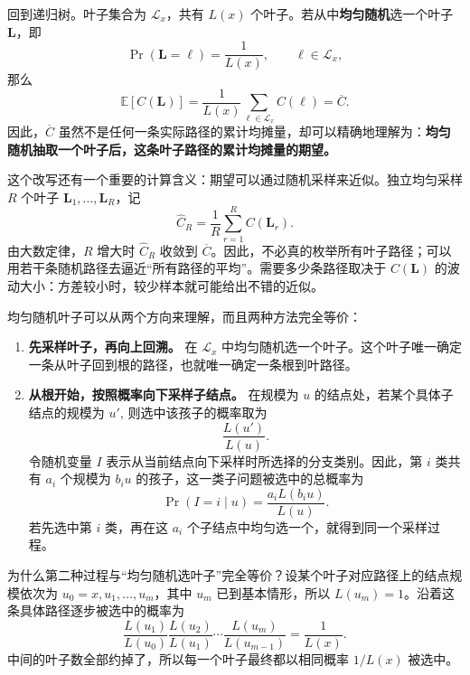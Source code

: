 \documentclass[11pt,a4paper]{article}
\begin{document}
回到递归树。叶子集合为 $\mathcal L_x$，共有 $L(x)$ 个叶子。若从中\textbf{均匀随机}选一个叶子 $\mathbf L$，即
\begin{equation}
\Pr(\mathbf L=\ell)=\frac{1}{L(x)},
\qquad \ell\in\mathcal L_x,
\label{eq:uniform-random-leaf}
\end{equation}
那么
\begin{equation}
\mathbb E[C(\mathbf L)]
=\frac{1}{L(x)}\sum_{\ell\in\mathcal L_x}C(\ell)
=\overline C.
\label{eq:random-leaf-expectation}
\end{equation}
因此，$\overline C$ 虽然不是任何一条实际路径的累计均摊量，却可以精确地理解为：\textbf{均匀随机抽取一个叶子后，这条叶子路径的累计均摊量的期望。}

这个改写还有一个重要的计算含义：期望可以通过随机采样来近似。独立均匀采样 $R$ 个叶子 $\mathbf L_1,\ldots,\mathbf L_R$，记
\begin{equation}
\widehat C_R
=\frac{1}{R}\sum_{r=1}^{R}C(\mathbf L_r).
\label{eq:monte-carlo-leaf-average}
\end{equation}
由大数定律，$R$ 增大时 $\widehat C_R$ 收敛到 $\overline C$。因此，不必真的枚举所有叶子路径；可以用若干条随机路径去逼近“所有路径的平均”。需要多少条路径取决于 $C(\mathbf L)$ 的波动大小：方差较小时，较少样本就可能给出不错的近似。

均匀随机叶子可以从两个方向来理解，而且两种方法完全等价：
\begin{enumerate}[label=(\arabic*)]
\item \textbf{先采样叶子，再向上回溯。} 在 $\mathcal L_x$ 中均匀随机选一个叶子。这个叶子唯一确定一条从叶子回到根的路径，也就唯一确定一条根到叶路径。
\item \textbf{从根开始，按照概率向下采样子结点。} 在规模为 $u$ 的结点处，若某个具体子结点的规模为 $u'$, 则选中该孩子的概率取为
\[
\frac{L(u')}{L(u)}.
\]
令随机变量 $I$ 表示从当前结点向下采样时所选择的分支类别。因此，第 $i$ 类共有 $a_i$ 个规模为 $b_i u$ 的孩子，这一类子问题被选中的总概率为
\begin{equation}
\Pr(I=i\mid u)
=\frac{a_iL(b_i u)}{L(u)}.
\label{eq:random-child-probability-exact}
\end{equation}
若先选中第 $i$ 类，再在这 $a_i$ 个子结点中均匀选一个，就得到同一个采样过程。
\end{enumerate}

为什么第二种过程与“均匀随机选叶子”完全等价？设某个叶子对应路径上的结点规模依次为 $u_0=x,u_1,\ldots,u_m$，其中 $u_m$ 已到基本情形，所以 $L(u_m)=1$。沿着这条具体路径逐步被选中的概率为
\begin{equation}
\frac{L(u_1)}{L(u_0)}
\frac{L(u_2)}{L(u_1)}
\cdots
\frac{L(u_m)}{L(u_{m-1})}
=\frac{1}{L(x)}.
\label{eq:leaf-probability-telescoping}
\end{equation}
中间的叶子数全部约掉了，所以每一个叶子最终都以相同概率 $1/L(x)$ 被选中。
\end{document}

